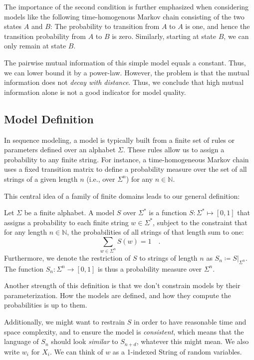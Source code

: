 \documentclass[../../main.tex]{subfiles}
\begin{document}
    The importance of the second condition is further emphasized when considering models like the following time-homogenous Markov chain consisting of the two states $A$ and $B$: The probability to transition from $A$ to $A$ is one, and hence the transition probability from $A$ to $B$ is zero. Similarly, starting at state $B$, we can only remain at state $B$.
    
    The pairwise mutual information of this simple model equals a constant. Thus, we can lower bound it by a power-law. However, the problem is that the mutual information does not \emph{decay with distance}. Thus, we conclude that high mutual information alone is not a good indicator for model quality.

\subsection{Model Definition}
    In sequence modeling, a model is typically built from a finite set of rules or parameters defined over an alphabet $\Sigma$. These rules allow us to assign a probability to any finite string. For instance, a time-homogeneous Markov chain uses a fixed transition matrix to define a probability measure over the set of all strings of a given length $n$ (i.e., over $\Sigma^n$) for any $n \in \mathbb{N}$.

    This central idea of a family of finite domains leads to our general definition:

    \begin{definition}
        \label{definition:model_over_sigma_star}
        Let $\Sigma$ be a finite alphabet. A model $S$ over $\Sigma^*$ is a function $S: \Sigma^* \mapsto [0, 1]$ that assigns a probability to each finite string $w \in \Sigma^*$, subject to the constraint that for any length $n \in \mathbb{N}$, the probabilities of all strings of that length sum to one:
        \[
            \sum_{w \in \Sigma^n} S(w) = 1 \quad .
        \]
        Furthermore, we denote the restriction of $S$ to strings of length $n$ as $S_n \coloneqq S|_{\Sigma^n}$. The function $S_n: \Sigma^n \to [0,1]$ is thus a probability measure over $\Sigma^n$.
    \end{definition}

    Another strength of this definition is that we don't constrain models by their parameterization. How the models are defined, and how they compute the probabilities is up to them.

    Additionally, we might want to restrain $S$ in order to have reasonable time and space complexity, and to ensure the model is \emph{consistent}, which means that the language of $S_n$ should look \emph{similar} to $S_{n + d}$, whatever this might mean. We also write $w_i$ for $X_i$. We can think of $w$ as a 1-indexed String of random variables.
\end{document}
